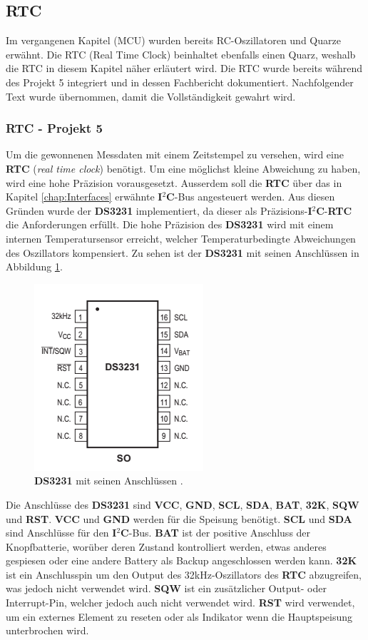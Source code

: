 \subsection{RTC}
\label{subsec:RTC}
Im vergangenen Kapitel (MCU) wurden bereits RC-Oszillatoren und Quarze erwähnt. Die RTC (Real Time Clock) beinhaltet ebenfalls einen Quarz, weshalb die RTC in diesem Kapitel näher erläutert wird.
Die RTC wurde bereits während des Projekt 5 integriert und in dessen Fachbericht dokumentiert. Nachfolgender Text wurde übernommen, damit die Vollständigkeit gewahrt wird.

\subsubsection{RTC - Projekt 5}
Um die gewonnenen Messdaten mit einem Zeitstempel zu versehen, wird eine \textbf{RTC} (\textit{real time clock}) benötigt. Um eine möglichst kleine Abweichung zu haben, wird eine hohe Präzision vorausgesetzt. Ausserdem soll die \textbf{RTC} über das in Kapitel \ref{chap:Interfaces} erwähnte \textbf{I$^2$C}-Bus angesteuert werden. Aus diesen Gründen wurde der \textbf{DS3231} implementiert, da dieser als Präzisions-\textbf{I$^2$C}-\textbf{RTC} die Anforderungen erfüllt. Die hohe Präzision des \textbf{DS3231} wird mit einem internen Temperatursensor erreicht, welcher Temperaturbedingte Abweichungen des Oszillators kompensiert. Zu sehen ist der \textbf{DS3231} mit seinen Anschlüssen in Abbildung \ref{fig:DS3231}.

\begin{figure}[h]
\centering
\includegraphics[width=0.4\linewidth]{graphics/DS3231.png}
\caption{\textbf{DS3231} mit seinen Anschlüssen \cite{DS3231DS}.}
\label{fig:DS3231}
\end{figure}

Die Anschlüsse des \textbf{DS3231} sind \textbf{VCC}, \textbf{GND}, \textbf{SCL}, \textbf{SDA}, \textbf{BAT}, \textbf{32K}, \textbf{SQW} und \textbf{RST}. \textbf{VCC} und \textbf{GND} werden für die Speisung benötigt. \textbf{SCL} und \textbf{SDA} sind Anschlüsse für den \textbf{I$^2$C}-Bus. \textbf{BAT} ist der positive Anschluss der Knopfbatterie, worüber deren Zustand kontrolliert werden, etwas anderes gespiesen oder eine andere Battery als Backup angeschlossen werden kann. \textbf{32K} ist ein Anschlusspin um den Output des 32kHz-Oszillators des \textbf{RTC} abzugreifen, was jedoch nicht verwendet wird. \textbf{SQW} ist ein zusätzlicher Output- oder Interrupt-Pin, welcher jedoch auch nicht verwendet wird. \textbf{RST} wird verwendet, um ein externes Element zu reseten oder als Indikator wenn die Hauptspeisung unterbrochen wird. \cite{DS3231DS}\\

